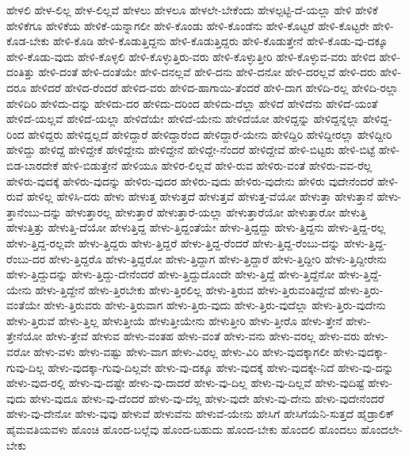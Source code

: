 {ಹೇಳಲಿ
ಹೇಳ-ಲಿಲ್ಲ
ಹೇಳ-ಲಿಲ್ಲವೆ
ಹೇಳಲು
ಹೇಳಲೂ
ಹೇಳಲೇ-ಬೇಕೆಂದು
ಹೇಳಲ್ಪಟ್ಟಿ-ದೆ-ಯಲ್ಲಾ
ಹೇಳಿ
ಹೇಳಿಕೆ
ಹೇಳಿಕೆಗೂ
ಹೇಳಿಕೆಯ
ಹೇಳಿಕೆ-ಯನ್ನಾಗಲೀ
ಹೇಳಿ-ಕೊಂಡು
ಹೇಳಿ-ಕೊಂಡೆನು
ಹೇಳಿ-ಕೊಟ್ಟರೆ
ಹೇಳಿ-ಕೊಟ್ಟರೇ
ಹೇಳಿ-ಕೊಡ-ಬೇಕು
ಹೇಳಿ-ಕೊಡಿ
ಹೇಳಿ-ಕೊಡುತ್ತಿದ್ದನು
ಹೇಳಿ-ಕೊಡುತ್ತಿದ್ದರು
ಹೇಳಿ-ಕೊಡುತ್ತೇನೆ
ಹೇಳಿ-ಕೊಡು-ವು-ದಕ್ಕೂ
ಹೇಳಿ-ಕೊಡು-ವುದು
ಹೇಳಿ-ಕೊಳ್ಳಲಿ
ಹೇಳಿ-ಕೊಳ್ಳುತ್ತಿರು-ವರು
ಹೇಳಿ-ಕೊಳ್ಳುತ್ತೀರಿ
ಹೇಳಿ-ಕೊಳ್ಳುವ-ವರು
ಹೇಳಿದ
ಹೇಳಿ-ದಂತಿತ್ತು
ಹೇಳಿ-ದಂತೆ
ಹೇಳಿ-ದಂತೆಯೇ
ಹೇಳಿ-ದನಲ್ಲವೆ
ಹೇಳಿ-ದನು
ಹೇಳಿ-ದನೋ
ಹೇಳಿ-ದರಲ್ಲವೆ
ಹೇಳಿ-ದರು
ಹೇಳಿ-ದರೂ
ಹೇಳಿದರೆ
ಹೇಳಿದ-ರೆಂದರೆ
ಹೇಳಿದ-ವರು
ಹೇಳಿದ-ಹಾಗಾಯಿ-ತೆಂದರೆ
ಹೇಳಿ-ದಾಗ
ಹೇಳಿದಿ-ರಲ್ಲ
ಹೇಳಿದಿ-ರಲ್ಲಾ
ಹೇಳಿದಿರಿ
ಹೇಳಿದು-ದನ್ನು
ಹೇಳಿದು-ದರ
ಹೇಳಿದು-ದರಿಂದ
ಹೇಳಿದು-ದೆಲ್ಲಾ
ಹೇಳಿದೆ
ಹೇಳಿದೆನು
ಹೇಳಿದೆ-ಯಂತೆ
ಹೇಳಿದೆ-ಯಲ್ಲವೆ
ಹೇಳಿದೆ-ಯಲ್ಲಾ
ಹೇಳಿದೆಯೇ
ಹೇಳಿದೆ-ಯೇನು
ಹೇಳಿದೆಯೋ
ಹೇಳಿದ್ದನ್ನು
ಹೇಳಿದ್ದನ್ನೆಲ್ಲಾ
ಹೇಳಿದ್ದ-ರಿಂದ
ಹೇಳಿದ್ದರು
ಹೇಳಿದ್ದಲ್ಲದೆ
ಹೇಳಿದ್ದಾರೆ
ಹೇಳಿದ್ದಾರೆಂದ
ಹೇಳಿದ್ದಾರೆ-ಯೇನು
ಹೇಳಿದ್ದಿರಿ
ಹೇಳಿದ್ದೀರಲ್ಲಾ
ಹೇಳಿದ್ದೀರಿ
ಹೇಳಿದ್ದು
ಹೇಳಿದ್ದೆ
ಹೇಳಿದ್ದೇಕೆ
ಹೇಳಿದ್ದೇನು
ಹೇಳಿದ್ದೇನೆ
ಹೇಳಿದ್ದೇ-ನೆಂದರೆ
ಹೇಳಿದ್ದೇವೆ
ಹೇಳಿ-ಬಿಟ್ಟರು
ಹೇಳಿ-ಬಿಟ್ಟೆ
ಹೇಳಿ-ಬಿಡ-ಬಾರದೇಕೆ
ಹೇಳಿ-ಬಿಡುತ್ತೇನೆ
ಹೇಳಿಯೂ
ಹೇಳಿರ-ಲಿಲ್ಲವೆ
ಹೇಳಿ-ರುವ
ಹೇಳಿರು-ವಂತೆ
ಹೇಳಿರು-ವವ-ರೆಲ್ಲ
ಹೇಳಿರು-ವುದಕ್ಕೆ
ಹೇಳಿರು-ವುದನ್ನು
ಹೇಳಿರು-ವುದರ
ಹೇಳಿರು-ವುದು
ಹೇಳಿರು-ವುದೇನು
ಹೇಳಿರು ವುದೇನೆಂದರೆ
ಹೇಳಿ-ರುವೆ
ಹೇಳಿಲ್ಲ
ಹೇಳಿಸಿ-ದರು
ಹೇಳು
ಹೇಳುತ್ತ
ಹೇಳುತ್ತದೆ
ಹೇಳುತ್ತವೆ
ಹೇಳುತ್ತ-ವೆಯೋ
ಹೇಳುತ್ತಾ
ಹೇಳುತ್ತಾನೆ
ಹೇಳು-ತ್ತಾನೆಂಬು-ದನ್ನು
ಹೇಳುತ್ತಾರಲ್ಲ
ಹೇಳುತ್ತಾರೆ
ಹೇಳುತ್ತಾರೆ-ಯಲ್ಲಾ
ಹೇಳುತ್ತಾರೆಯೋ
ಹೇಳುತ್ತಾರೋ
ಹೇಳುತ್ತಿ
ಹೇಳುತ್ತಿತ್ತು
ಹೇಳುತ್ತಿ-ದೆಯೋ
ಹೇಳುತ್ತಿದ್ದ
ಹೇಳು-ತ್ತಿದ್ದಂತೆಯೇ
ಹೇಳು-ತ್ತಿದ್ದದ್ದು
ಹೇಳು-ತ್ತಿದ್ದನು
ಹೇಳು-ತ್ತಿದ್ದ-ರಲ್ಲ
ಹೇಳು-ತ್ತಿದ್ದ-ರಲ್ಲವೇ
ಹೇಳು-ತ್ತಿದ್ದರು
ಹೇಳು-ತ್ತಿದ್ದರೆ
ಹೇಳು-ತ್ತಿದ್ದ-ರೆಂದರೆ
ಹೇಳು-ತ್ತಿದ್ದ-ರೆಂಬು-ದನ್ನು
ಹೇಳು-ತ್ತಿದ್ದ-ರೆಂಬು-ದರ
ಹೇಳು-ತ್ತಿದ್ದರೊ
ಹೇಳು-ತ್ತಿದ್ದರೋ
ಹೇಳು-ತ್ತಿದ್ದಾಗ
ಹೇಳು-ತ್ತಿದ್ದಾರೆ
ಹೇಳು-ತ್ತಿದ್ದೀರಿ
ಹೇಳು-ತ್ತಿದ್ದೀರೇನು
ಹೇಳು-ತ್ತಿದ್ದುದನ್ನು
ಹೇಳು-ತ್ತಿದ್ದು-ದೇನೆಂದರೆ
ಹೇಳು-ತ್ತಿದ್ದುದೊಂದೇ
ಹೇಳು-ತ್ತಿದ್ದೆ
ಹೇಳು-ತ್ತಿದ್ದೆನೋ
ಹೇಳು-ತ್ತಿದ್ದೆ-ಯೇನು
ಹೇಳು-ತ್ತಿದ್ದೇನೆ
ಹೇಳು-ತ್ತಿರಬೇಕು
ಹೇಳು-ತ್ತಿರಲಿಲ್ಲ
ಹೇಳು-ತ್ತಿರುವ
ಹೇಳು-ತ್ತಿರುವಂತಿದ್ದೇವೆ
ಹೇಳು-ತ್ತಿರು-ವಂತೆಯೇ
ಹೇಳು-ತ್ತಿರುವರು
ಹೇಳು-ತ್ತಿರುವಾಗ
ಹೇಳು-ತ್ತಿರು-ವುದು
ಹೇಳು-ತ್ತಿರು-ವುದೆಲ್ಲಾ
ಹೇಳು-ತ್ತಿರು-ವುದೇನು
ಹೇಳು-ತ್ತಿರುವೆ
ಹೇಳು-ತ್ತಿಲ್ಲ
ಹೇಳುತ್ತೀಯೆ
ಹೇಳುತ್ತೀಯೇನು
ಹೇಳುತ್ತೀರಿ
ಹೇಳು-ತ್ತೀರೊ
ಹೇಳು-ತ್ತೇನೆ
ಹೇಳು-ತ್ತೇನೆಯೋ
ಹೇಳು-ತ್ತೇವೆ
ಹೇಳುವ
ಹೇಳು-ವಂತಹ
ಹೇಳು-ವಂತೆ
ಹೇಳು-ವನು
ಹೇಳು-ವರಲ್ಲ
ಹೇಳು-ವರು
ಹೇಳು-ವರೋ
ಹೇಳು-ವಳು
ಹೇಳು-ವಷ್ಟು
ಹೇಳು-ವಾಗ
ಹೇಳು-ವಿರಲ್ಲ
ಹೇಳು-ವಿರಿ
ಹೇಳು-ವುದಕ್ಕಾಗಲೀ
ಹೇಳು-ವುದಕ್ಕಾ-ಗುವು-ದಿಲ್ಲ
ಹೇಳು-ವುದಕ್ಕಾ-ಗುವು-ದಿಲ್ಲವೇ
ಹೇಳು-ವು-ದಕ್ಕೂ
ಹೇಳು-ವುದಕ್ಕೆ
ಹೇಳು-ವುದಕ್ಕೇ-ನಿದೆ
ಹೇಳು-ವು-ದನ್ನು
ಹೇಳು-ವುದ-ರಲ್ಲಿ
ಹೇಳು-ವು-ದಷ್ಟೇ
ಹೇಳು-ವು-ದಾದರೆ
ಹೇಳು-ವು-ದಿಲ್ಲ
ಹೇಳು-ವು-ದಿಲ್ಲವೆ
ಹೇಳು-ವುದಿಷ್ಟೆ
ಹೇಳು-ವುದು
ಹೇಳು-ವುದೂ
ಹೇಳು-ವು-ದೆಂದರೆ
ಹೇಳು-ವು-ದೆಲ್ಲ
ಹೇಳು-ವುದೇ
ಹೇಳು-ವು-ದೇನು
ಹೇಳು-ವುದೇನೆಂದರೆ
ಹೇಳು-ವು-ದೇನೋ
ಹೇಳು-ವುವು
ಹೇಳುವೆ
ಹೇಳುವೆನು
ಹೇಳುವೆ-ಯೇನು
ಹೇಸಿಗೆ
ಹೇಸಿಗೆಯೆನಿ-ಸುತ್ತದೆ
ಹೈಡ್ರಾಲಿಕ್
ಹೈಮವತಿಯವಳು
ಹೊಂಚಿ
ಹೊಂದ-ಬಲ್ಲೆವು
ಹೊಂದ-ಬಹುದು
ಹೊಂದ-ಬೇಕು
ಹೊಂದಲಿ
ಹೊಂದಲು
ಹೊಂದಲೇ-ಬೇಕು
}
